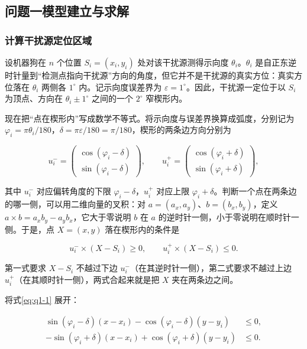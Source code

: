 \subsection{问题一模型建立与求解}\label{sec:q1}
\subsubsection{计算干扰源定位区域}\label{sec:q1-1}

设机器狗在 $n$ 个位置 $S_i=(x_i,y_i)$ 处对该干扰源测得示向度 $\theta_i$。$\theta_i$ 是自正东逆时针量到“检测点指向干扰源”方向的角度，但它并不是干扰源的真实方位：真实方位落在 $\theta_i$ 两侧各 $1^\circ$ 内。记示向度误差界为 $\varepsilon=1^\circ$。因此，干扰源一定位于以 $S_i$ 为顶点、方向在 $\theta_i\pm1^\circ$ 之间的一个 $2^\circ$ 窄楔形内。

现在把“点在楔形内”写成数学不等式。将示向度与误差界换算成弧度，分别记为 $\varphi_i=\pi\theta_i/180$，$\delta=\pi\varepsilon/180=\pi/180$，楔形的两条边方向分别为

\[
u_i^-=\begin{pmatrix}\cos(\varphi_i-\delta)\\ \sin(\varphi_i-\delta)\end{pmatrix},\qquad
u_i^+=\begin{pmatrix}\cos(\varphi_i+\delta)\\ \sin(\varphi_i+\delta)\end{pmatrix},
\]

其中 $u_i^-$ 对应偏转角度的下限 $\varphi_i-\delta$，$u_i^+$ 对应上限 $\varphi_i+\delta$。判断一个点在两条边的哪一侧，可以用二维向量的叉积：对 $a=(a_x,a_y)$、$b=(b_x,b_y)$，定义 $a\times b=a_xb_y-a_yb_x$，它大于零说明 $b$ 在 $a$ 的逆时针一侧，小于零说明在顺时针一侧。于是，点 $X=(x,y)$ 落在楔形内的条件是

\begin{equation}\label{eq:q1-1}
u_i^-\times(X-S_i)\ge 0,\qquad u_i^+\times(X-S_i)\le 0.
\end{equation}

第一式要求 $X-S_i$ 不越过下边 $u_i^-$（在其逆时针一侧），第二式要求不越过上边 $u_i^+$（在其顺时针一侧），两式合起来就是把 $X$ 夹在两条边之间。

将式\eqref{eq:q1-1} 展开：

\begin{equation}\label{eq:q1-2}
\begin{aligned}
\sin(\varphi_i-\delta)(x-x_i)-\cos(\varphi_i-\delta)(y-y_i)&\le 0,\\
-\sin(\varphi_i+\delta)(x-x_i)+\cos(\varphi_i+\delta)(y-y_i)&\le 0.
\end{aligned}
\end{equation}

